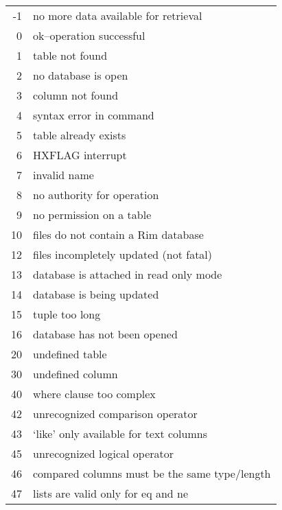 \begin{figure}[p]
\centering
\begin{tabular}{rl}
 -1& no more data available for retrieval                  \\
  0& ok--operation successful                              \\
  1& table not found                                       \\
  2& no database is open                                   \\
  3& column not found                                      \\
  4& syntax error in command                               \\
  5& table already exists                                  \\
  6& HXFLAG interrupt                                      \\
  7& invalid name                                          \\
  8& no authority for operation                            \\
  9& no permission on a table                              \\
 10& files do not contain a Rim database        \\
 12& files incompletely updated (not fatal)       \\
 13& database is attached in read only mode                \\
 14& database is being updated                             \\
 15& tuple too long                                        \\
 16& database has not been opened                          \\
 20& undefined table                                    \\
 30& undefined column                                   \\
 40& where clause too complex                           \\
 42& unrecognized comparison operator                      \\
 43& `like' only available for text columns           \\
 45& unrecognized logical operator                          \\
 46& compared columns must be the same type/length      \\
 47& lists are valid only for eq and ne                    \\

\end{tabular}
\end{figure}
